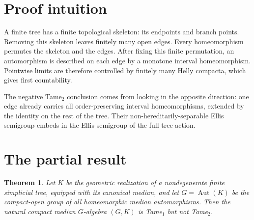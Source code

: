 \documentclass[11pt]{article}
\newtheorem{theorem}{Theorem}
\newcommand{\Aut}{\operatorname{Aut}}
\begin{document}
\section{Proof intuition}

A finite tree has a finite topological skeleton: its endpoints and branch
points. Removing this skeleton leaves finitely many open edges. Every
homeomorphism permutes the skeleton and the edges. After fixing this finite
permutation, an automorphism is described on each edge by a monotone interval
homeomorphism. Pointwise limits are therefore controlled by finitely many
Helly compacta, which gives first countability.

The negative Tame$_2$ conclusion comes from looking in the opposite direction:
one edge already carries all order-preserving interval homeomorphisms, extended
by the identity on the rest of the tree. Their non-hereditarily-separable Ellis
semigroup embeds in the Ellis semigroup of the full tree action.

\section{The partial result}

\begin{theorem}\label{thm:main}
Let $K$ be the geometric realization of a nondegenerate finite simplicial tree,
equipped with its canonical median, and let
$G=\Aut(K)$ be the compact-open group of all homeomorphic median
automorphisms. Then the natural compact median $G$-algebra $(G,K)$ is
Tame$_1$ but not Tame$_2$.
\end{theorem}
\end{document}
